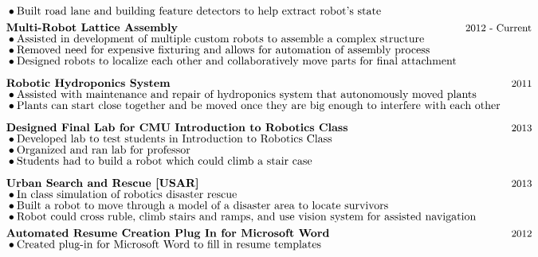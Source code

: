 \documentclass[]{article}
\newcommand{\subpoint}[1]{\bullet \text{\fontsize{10pt}{12pt}\selectfont #1}}
\newcommand{\Date}[1]{ \text{\fontsize{9pt}{12pt}\selectfont #1}}
\begin{document}
\begin{align*}
& && \subpoint{Built road lane and building feature detectors to help extract robot’s state} \\
%
%
& &&\textbf{Multi-Robot Lattice Assembly} && 
\hspace{-1.45cm} \Date{2012 - Current} \\[-.5em]
& && \subpoint{ Assisted in development of  multiple custom robots to assemble a complex structure}\\[-.5em]
& && \subpoint{ Removed need for expensive fixturing and allows for automation of assembly process}\\[-.5em]
& && \subpoint{ Designed robots to localize each other and collaboratively move parts for final attachment }\\[.5em]
& &&\textbf{Robotic Hydroponics System} &&  \hspace{0cm} \Date{2011}\\[-.5em]
& &&\subpoint{Assisted with maintenance and repair of hydroponics system that autonomously moved plants}\\[-.5em]
& && \subpoint{Plants can start close together and be moved once they are big enough to interfere with each other}\\[.5em]
& && \textbf{Designed Final Lab for CMU Introduction to Robotics Class} && \hspace{0cm} \Date{2013}\\[-.5em]
& && \subpoint{Developed lab to test students in Introduction to Robotics Class}\\[-.5em]
& && \subpoint{Organized and ran lab for professor}\\[-.5em]
& && \subpoint{Students had to build a robot which could climb a stair case }\\[.5em]
& && \textbf{Urban Search and Rescue [USAR]} && \hspace{0cm} \Date{2013}\\[-.5em]
& && \subpoint{In class simulation of robotics disaster rescue}\\[-.5em]
& && \subpoint{Built a robot to move through a model of a disaster area to locate survivors}\\[-.5em]
& && \subpoint{Robot could cross ruble, climb stairs and ramps, and use vision system for assisted navigation}\\
& &&\textbf{Automated Resume Creation Plug In for Microsoft Word} && \hspace{0cm} \Date{2012} \\[-.5em]
& && \subpoint{Created plug-in for Microsoft Word to fill in resume templates}\\[-.5em]

\end{align*}
\end{document}
